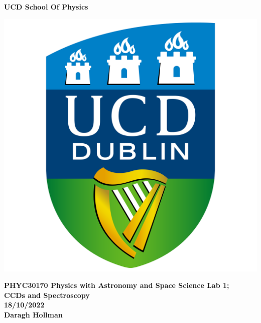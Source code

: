 \documentclass[a4paper,12pt,twocolumn]{article}
\begin{document}
	
	\begin{titlepage}
		\begin{center}
			
			\thispagestyle{empty}
			
			\Huge{
				\textbf{UCD School Of Physics}
			}
			
			\vspace{1cm}	
			
			\includegraphics[scale=0.08]{UCDLogo.png}
			
			\vspace{1cm}
			
			\large{
				\textbf{PHYC30170 Physics with Astronomy and Space Science Lab 1; \\
					CCDs and Spectroscopy \\
					\vspace{1cm}
					18/10/2022 \\
					\vspace{1cm}
					Daragh Hollman}
			} \\
			
		\end{center}
	\end{titlepage}
	
\end{document}
